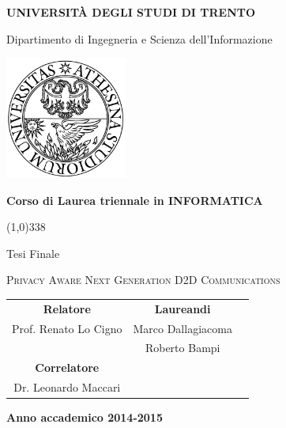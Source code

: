 \begin{titlepage}
  \pagestyle{empty}

  \begin{center}
    {\bfseries
      \Large {\huge U}NIVERSITÀ DEGLI STUDI DI {\huge T}RENTO}

    \vspace{0.2cm}

    {\Large Dipartimento di Ingegneria e Scienza dell'Informazione}

    \vspace{0.5cm}

    \begin{center}
      \includegraphics[width=0.3\textwidth]{img/logo_unitn.png}
    \end{center}

    \vspace{0.5cm}

    {\bfseries \Large Corso di Laurea triennale in INFORMATICA}

    \vspace{0.3cm}
    \line(1,0){338}
    \vspace{0.3cm}

    {\Large Tesi Finale}

    \vspace{2cm}

    {\huge \textsc{Privacy Aware Next Generation D2D Communications}\\}

    \vspace{2.5cm}

    \large
    \begin{center}
      \begin{tabular}{ccc}
        {\bfseries Relatore} &
        \hspace{5cm}
        {\bfseries Laureandi} \\

        Prof. Renato Lo Cigno &
        \hspace{5cm} Marco Dallagiacoma \\
        & \hspace{5cm} Roberto Bampi \\
        
        {\bfseries Correlatore} &  \\
        Dr. Leonardo Maccari & \\

      \end{tabular}
    \end{center}
    \vspace{2cm}

    {\bfseries Anno accademico 2014-2015}
    \vfill
  \end{center}
\end{titlepage}